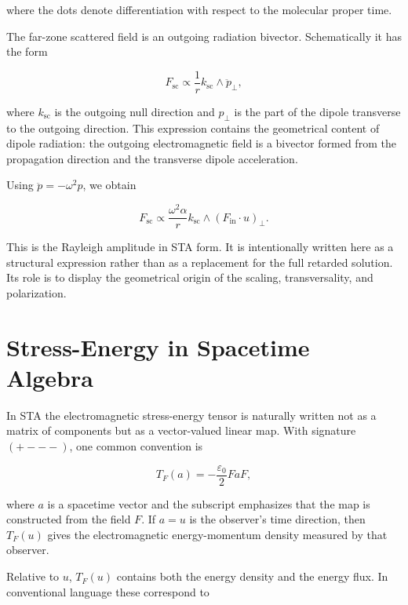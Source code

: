 \documentclass[11pt,a4paper]{article}
\begin{document}
where the dots denote differentiation with respect to the molecular proper
time.

The far-zone scattered field is an outgoing radiation bivector. Schematically
it has the form

\begin{equation}
F_{\mathrm{sc}}
\propto
\frac{1}{r}
k_{\mathrm{sc}}\wedge \ddot{p}_{\perp},
\end{equation}

where \(k_{\mathrm{sc}}\) is the outgoing null direction and \(p_{\perp}\) is
the part of the dipole transverse to the outgoing direction. This expression
contains the geometrical content of dipole radiation: the outgoing
electromagnetic field is a bivector formed from the propagation direction and
the transverse dipole acceleration.

Using \(\ddot{p}=-\omega^2 p\), we obtain

\begin{equation}
F_{\mathrm{sc}}
\propto
\frac{\omega^2\alpha}{r}
k_{\mathrm{sc}}\wedge
(F_{\mathrm{in}}\cdot u)_{\perp}.
\end{equation}

This is the Rayleigh amplitude in STA form. It is intentionally written here
as a structural expression rather than as a replacement for the full retarded
solution. Its role is to display the geometrical origin of the scaling,
transversality, and polarization.

\section{Stress-Energy in Spacetime Algebra}

In STA the electromagnetic stress-energy tensor is naturally written not as
a matrix of components but as a vector-valued linear map. With signature
\((+---)\), one common convention is

\begin{equation}
T_F(a) =
-\frac{\varepsilon_0}{2}FaF,
\end{equation}

where \(a\) is a spacetime vector and the subscript emphasizes that the map is
constructed from the field \(F\). If \(a=u\) is the observer's time direction,
then \(T_F(u)\) gives the electromagnetic energy-momentum density measured by
that observer.

Relative to \(u\), \(T_F(u)\) contains both the energy density and the energy
flux. In conventional language these correspond to
\end{document}
